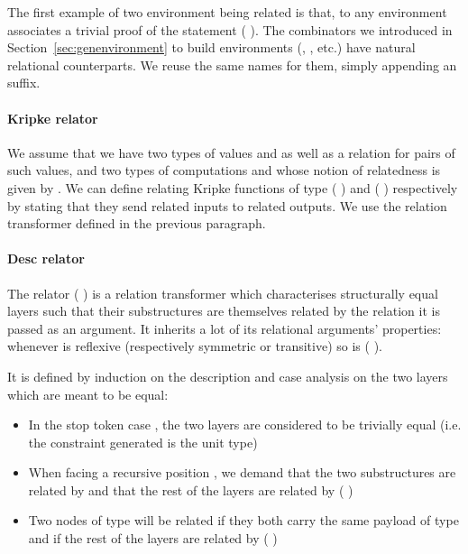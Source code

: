 \begin{agdasnippet}
\end{agdasnippet}

The first example of two environment being related is  that, to any
environment  associates a trivial proof of the statement
{(    )}.
The combinators we introduced in Section~\ref{sec:genenvironment} to build environments
(, , etc.) have natural relational counterparts. We reuse the same
names for them, simply appending an  suffix.

\paragraph*{Kripke relator}
We assume that we have two types of values  and 
as well as a relation  for pairs of such values, and two types of computations
 and  whose notion of relatedness is given by . We can define
 relating Kripke functions of type
{(  )} and {(  )}
respectively by stating that they send related inputs
to related outputs. We use the relation transformer  defined in the previous
paragraph.

\begin{agdasnippet}
\end{agdasnippet}

\paragraph*{Desc relator}
The relator (  ) is a relation transformer which characterises
structurally equal layers such that their substructures are themselves related
by the relation it is passed as an argument. It inherits a lot of its relational
arguments' properties: whenever  is reflexive (respectively symmetric or
transitive) so is {(   )}.\label{lem:zipstable}

It is defined by induction on the description and case analysis on the two
layers which are meant to be equal:
\begin{itemize}
  \item In the stop token case  , the two layers are considered to
    be trivially equal (i.e. the constraint generated is the unit type)
  \item When facing a recursive position { \AB{$\Delta$}  }, we
    demand that the two substructures are related by { \AB{$\Delta$} }
    and that the rest of the layers are related by (   )
  \item Two nodes of type {  } will
    be related if they both carry the same payload  of type  and if
    the rest of the layers are related by (    )
\end{itemize}

